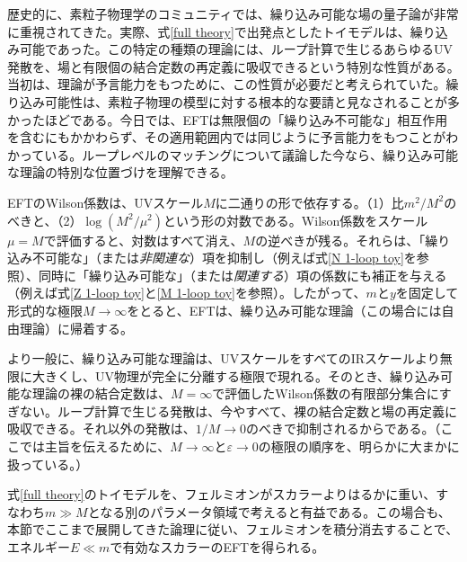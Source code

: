  \label{sec: renormalizable theories}




歴史的に、素粒子物理学のコミュニティでは、繰り込み可能な場の量子論が非常に重視されてきた。実際、式\eqref{full theory}で出発点としたトイモデルは、繰り込み可能であった。この特定の種類の理論には、ループ計算で生じるあらゆるUV発散を、場と有限個の結合定数の再定義に吸収できるという特別な性質がある。当初は、理論が予言能力をもつために、この性質が必要だと考えられていた。繰り込み可能性は、素粒子物理の模型に対する根本的な要請と見なされることが多かったほどである。今日では、EFTは無限個の「繰り込み不可能な」相互作用を含むにもかかわらず、その適用範囲内では同じように予言能力をもつことがわかっている。ループレベルのマッチングについて議論した今なら、繰り込み可能な理論の特別な位置づけを理解できる。

EFTのWilson係数は、UVスケール$M$に二通りの形で依存する。（1）比$m^2/M^2$のべきと、（2）$\log (M^2/\mu^2)$という形の対数である。Wilson係数をスケール$\mu = M$で評価すると、対数はすべて消え、$M$の逆べきが残る。それらは、「繰り込み不可能な」（または\emph{非関連な}）項を抑制し（例えば式\eqref{N 1-loop toy}を参照）、同時に「繰り込み可能な」（または\emph{関連する}）項の係数にも補正を与える（例えば式\eqref{Z 1-loop toy}と\eqref{M 1-loop toy}を参照）。したがって、$m$と$y$を固定して形式的な極限$M \to \infty$をとると、EFTは、繰り込み可能な理論（この場合には自由理論）に帰着する。

より一般に、繰り込み可能な理論は、UVスケールをすべてのIRスケールより無限に大きくし、UV物理が完全に分離する極限で現れる。そのとき、繰り込み可能な理論の裸の結合定数は、$M = \infty$で評価したWilson係数の有限部分集合にすぎない。ループ計算で生じる発散は、今やすべて、裸の結合定数と場の再定義に吸収できる。それ以外の発散は、$1/M \to 0$のべきで抑制されるからである。（ここでは主旨を伝えるために、$M \to \infty$と$\varepsilon \to 0$の極限の順序を、明らかに大まかに扱っている。）



 \label{sec: naturalness}



式\eqref{full theory}のトイモデルを、フェルミオンがスカラーよりはるかに重い、すなわち$m \gg M$となる別のパラメータ領域で考えると有益である。この場合も、本節でここまで展開してきた論理に従い、フェルミオンを積分消去することで、エネルギー$E \ll m$で有効なスカラーのEFTを得られる。

